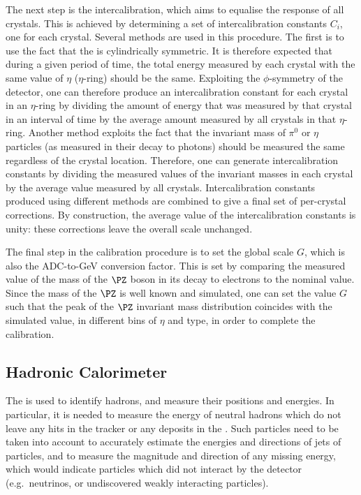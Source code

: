 The next step is the intercalibration, which aims to equalise the response of all crystals. This is achieved by determining a set of intercalibration constants $C_{i}$, one for each crystal. Several methods are used in this procedure. The first is to use the fact that the \CMS \ECAL is cylindrically symmetric. It is therefore expected that during a given period of time, the total energy measured by each crystal with the same value of $\eta$ ($\eta$-ring) should be the same. Exploiting the $\phi$-symmetry of the detector, one can therefore produce an intercalibration constant for each crystal in an $\eta$-ring by dividing the amount of energy that was measured by that crystal in an interval of time by the average amount measured by all crystals in that $\eta$-ring. Another method exploits the fact that the invariant mass of $\pi^0$ or $\eta$ particles (as measured in their decay to photons) should be measured the same regardless of the crystal location. Therefore, one can generate intercalibration constants by dividing the measured values of the invariant masses in each crystal by the average value measured by all crystals. Intercalibration constants produced using different methods are combined to give a final set of per-crystal corrections. By construction, the average value of the intercalibration constants is unity: these corrections leave the overall scale unchanged.

The final step in the calibration procedure is to set the global scale $G$, which is also the ADC-to-GeV conversion factor. This is set by comparing the measured value of the mass of the $\PZ$ boson in its decay to electrons to the nominal value. Since the mass of the $\PZ$ is well known and simulated, one can set the value $G$ such that the peak of the $\PZ$ invariant mass distribution coincides with the simulated value, in different bins of $\eta$ and \SC type, in order to complete the calibration.


\subsection{Hadronic Calorimeter}
\label{sec:cms:hcal}

The \HCAL is used to identify hadrons, and measure their positions and energies. In particular, it is needed to measure the energy of neutral hadrons which do not leave any hits in the tracker or any deposits in the \ECAL. Such particles need to be taken into account to accurately estimate the energies and directions of jets of particles, and to measure the magnitude and direction of any missing energy, which would indicate particles which did not interact by the \CMS detector (e.g.~neutrinos, or undiscovered weakly interacting particles). 

